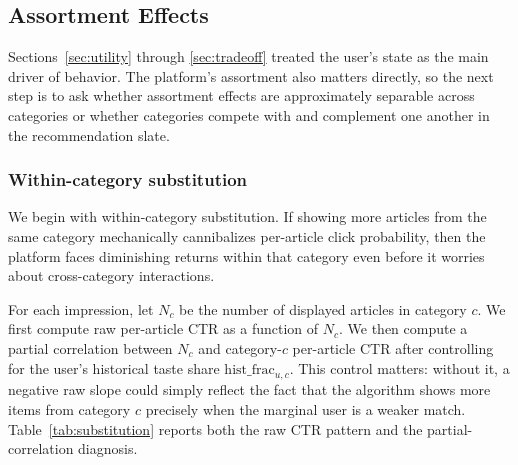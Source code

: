\documentclass[11pt]{article}
\begin{document}
\subsection{Assortment Effects}
\label{sec:assortment}

Sections~\ref{sec:utility} through \ref{sec:tradeoff} treated the user's state as the main driver of behavior. The platform's assortment also matters directly, so the next step is to ask whether assortment effects are approximately separable across categories or whether categories compete with and complement one another in the recommendation slate.

\subsubsection{Within-category substitution}

We begin with within-category substitution. If showing more articles from the same category mechanically cannibalizes per-article click probability, then the platform faces diminishing returns within that category even before it worries about cross-category interactions.

For each impression, let $N_c$ be the number of displayed articles in category $c$. We first compute raw per-article CTR as a function of $N_c$. We then compute a partial correlation between $N_c$ and category-$c$ per-article CTR after controlling for the user's historical taste share $\text{hist\_frac}_{u,c}$. This control matters: without it, a negative raw slope could simply reflect the fact that the algorithm shows more items from category $c$ precisely when the marginal user is a weaker match. Table~\ref{tab:substitution} reports both the raw CTR pattern and the partial-correlation diagnosis.
\end{document}
